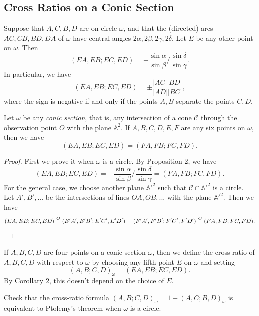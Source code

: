 \subsection{Cross Ratios on a Conic Section}

\begin{prop} Suppose that $A,C,B,D$ are on circle $\omega$, and that the (directed) arcs $AC,CB,BD,DA$ of $\omega$ have central angles $2\alpha,2\beta,2\gamma,2\delta$. Let $E$ be any other point on $\omega$. Then
\[
(EA,EB;EC,ED) = -\frac{\sin \alpha}{\sin \beta}\bigg/\frac{\sin \delta}{\sin \gamma}.
\]
In particular, we have
\[
(EA,EB;EC,ED) = \pm\frac{|AC||BD|}{|AD||BC|},
\]
where the sign is negative if and only if the points $A,B$ separate the points $C,D$.
\end{prop}

\begin{cor} Let $\omega$ be any \emph{conic section}, that is, any intersection of a cone $\mathcal{C}$ through the observation point $O$ with the plane $\mathbb{A}^2$. If $A,B,C,D,E,F$ are any six points on $\omega$, then we have
\[
(EA,EB;EC,ED) = (FA,FB;FC,FD).
\]
\end{cor}
\begin{proof} First we prove it when $\omega$ is a circle. By Proposition 2, we have
\[
(EA,EB;EC,ED) = -\frac{\sin \alpha}{\sin \beta}\bigg/\frac{\sin \delta}{\sin \gamma} = (FA,FB;FC,FD).
\]
For the general case, we choose another plane $\mathbb{A'}^2$ such that $\mathcal{C}\cap\mathbb{A'}^2$ is a circle. Let $A',B',...$ be the intersections of lines $OA,OB, ...$ with the plane $\mathbb{A'}^2$. Then we have
\[
(EA,EB;EC,ED) \stackrel{O}{=} (E'A',E'B';E'C',E'D') = (F'A',F'B';F'C',F'D') \stackrel{O}{=} (FA,FB;FC,FD).\qedhere
\]
\end{proof}

\begin{defn} If $A,B,C,D$ are four points on a conic section $\omega$, then we define the cross ratio of $A,B,C,D$ with respect to $\omega$ by choosing any fifth point $E$ on $\omega$ and setting
\[
(A,B;C,D)_{\omega} = (EA,EB;EC,ED).
\]
By Corollary 2, this doesn't depend on the choice of $E$.
\end{defn}

\begin{exer} Check that the cross-ratio formula $(A,B;C,D)_\omega = 1 - (A,C;B,D)_\omega$ is equivalent to Ptolemy's theorem when $\omega$ is a circle.
\end{exer}

